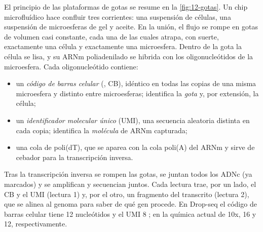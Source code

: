 El principio de las plataformas de gotas se resume en la \cref{fig:12-gotas}. Un chip microfluídico hace confluir tres corrientes: una suspensión de células, una suspensión de microesferas de gel y aceite. En la unión, el flujo se rompe en gotas de volumen casi constante, cada una de las cuales atrapa, con suerte, exactamente una célula y exactamente una microesfera. Dentro de la gota la célula se lisa, y su ARNm poliadenilado se hibrida con los oligonucleótidos de la microesfera. Cada oligonucleótido contiene:

\begin{itemize}
  \item un \emph{código de barras celular} (, CB), idéntico en todas las copias de una misma microesfera y distinto entre microesferas; identifica la \emph{gota} y, por extensión, la célula;
  \item un \emph{identificador molecular único} (UMI), una secuencia aleatoria distinta en cada copia; identifica la \emph{molécula} de ARNm capturada;
  \item una cola de poli(dT), que se aparea con la cola poli(A) del ARNm y sirve de cebador para la transcripción inversa.
\end{itemize}

Tras la transcripción inversa se rompen las gotas, se juntan todos los ADNc (ya marcados) y se amplifican y secuencian juntos. Cada lectura trae, por un lado, el CB y el UMI (lectura 1) y, por el otro, un fragmento del transcrito (lectura 2), que se alinea al genoma para saber de qué gen procede. En Drop-seq el código de barras celular tiene 12 nucleótidos y el UMI 8 \parencite{c12-macosko2015}; en la química actual de 10x, 16 y 12, respectivamente.

